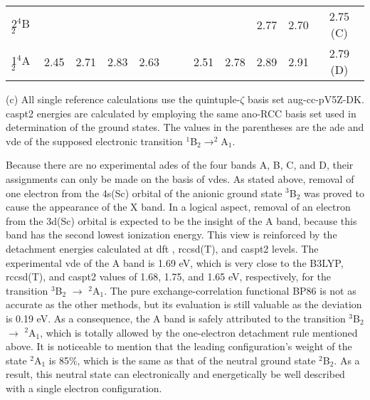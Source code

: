 \begin{refsection}
\begin{landscape}
\begin{table}[htb!]
\begin{threeparttable}
\begin{tabular}{@{\extracolsep{\fill}}lccccccccccc@{}}
	2$^4$B$_2$    &       &      &          &             &        &  &       &      & 2.77     & 2.70        & 2.75 (C) \\
	1$^4$A$_2$    & 2.45  & 2.71 & 2.83     & 2.63        &        &  & 2.51  & 2.78 & 2.89     & 2.91        & 2.79 (D) \\ \bottomrule
\end{tabular}
	\begin{tablenotes}
	\item[(c)] All single reference calculations use the quintuple-$\zeta$ basis set aug-cc-pV5Z-DK. \acrshort{caspt2} energies are calculated by employing the same \acrshort{ano}-RCC basis set used in determination of the ground states. The values in the parentheses are the \acrshort{ade} and \acrshort{vde} of the supposed electronic transition $^1$B$_2 \longrightarrow ^2$A$_1$.
	\end{tablenotes}
	\end{threeparttable}   
\end{table}                                                                    
\end{landscape}


Because there are no experimental \acrshort{ade}s of the four bands A, B, C, and D, their assignments can only be made on the basis of \acrshort{vde}s. As stated above, removal of one electron from the 4s(Sc) orbital of the anionic ground state $^3$B$_2$ was proved to cause the appearance of the X band. In a logical aspect, removal of an electron from the 3d(Sc) orbital is expected to be the insight of the A band, because this band has the second lowest ionization energy. This view is reinforced by the detachment energies calculated at \acrshort{dft} , \acrshort{rccsd}(T), and \acrshort{caspt2} levels. The experimental \acrshort{vde} of the A band is 1.69 eV, which is very close to the B3LYP, \acrshort{rccsd}(T), and \acrshort{caspt2} values of 1.68, 1.75, and 1.65 eV, respectively, for the transition $^3$B$_2$ $\longrightarrow$ $^2$A$_1$. The pure exchange-correlation functional BP86 is not as accurate as the other methods, but its evaluation is still valuable as the deviation is 0.19 eV. As a consequence, the A band is safely attributed to the transition $^3$B$_2$ $\longrightarrow$ $^2$A$_1$, which is totally allowed by the one-electron detachment rule mentioned above. It is noticeable to mention that the leading configuration’s weight of the state $^2$A$_1$ is 85$\%$, which is the same as that of the neutral ground state $^2$B$_2$. As a result, this neutral state can electronically and energetically be well described with a single electron configuration.




\end{refsection}
